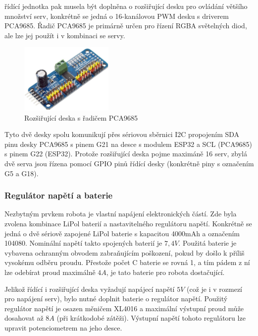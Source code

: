řídící jednotka pak musela být doplněna o rozšiřující desku pro ovládání většího množství serv, konkrétně se jedná o 16-kanálovou PWM desku s driverem PCA9685. Řadič PCA9685 je primárně určen pro řízení RGBA světelných diod, ale lze jej použít i v kombinaci se servy.

\begin{figure}[hbt]
	\centering
	\includegraphics[width=0.4\textwidth]{obrazky-figures/pca9685.jpg}
	\caption[pca9685]{Rozšiřující deska s řadičem PCA9685\footnotemark}
	\label{pca9685}
\end{figure}


Tyto dvě desky spolu komunikují přes sériovou sběrnici I2C propojením SDA pinu desky PCA9685 s pinem G21 na desce s modulem ESP32 a SCL (PCA9685) s pinem G22 (ESP32). Protože rozšiřující deska pojme maximáně 16 serv, zbylá dvě serva jsou řízena pomocí GPIO pinů řídící desky (konkrétně piny s označením G5 a G18).

\subsubsection*{Regulátor napětí a baterie}
Nezbytným prvkem robota je vlastní napájení elektronických částí. Zde byla zvolena kombinace LiPol baterií a nastavitelného regulátoru napětí. Konkrétně se jedná o dvě sériově zapojené LiPol baterie s kapacitou 4000mAh a označením 104080. Nominální napětí takto spojených baterií je $7,4V$. Použitá baterie je vybavena ochranným obvodem zabraňujícím poškození, pokud by došlo k příliš vysokému odběru proudu. Přestože počet C baterie se rovná 1, a tím pádem z ní lze odebírat proud maximálně $4A$, je tato baterie pro robota dostačující.

Jelikož řídící i rozšiřující deska vyžadují napájecí napětí $5V$ (což je i v rozmezí pro napájení serv), bylo nutné doplnit baterie o regulátor napětí. Použitý regulátor napětí je osazen měničem XL4016 a maximální výstupní proud může dosahovat až $8A$ (při krátkodobé zátěži). Výstupní napětí tohoto regulátoru lze upravit potenciometrem na jeho desce.


